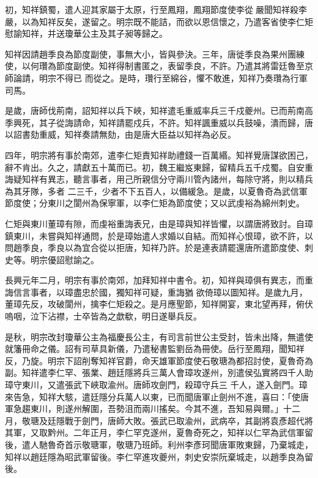 \begin{pinyinscope}
 初，知祥鎮蜀，遣人迎其家屬于太原，行至鳳翔，鳳翔節度使李從嚴聞知祥殺李嚴，以為知祥反矣，遂留之。明宗既不能詰，而欲以恩信懷之，乃遣客省使李仁矩慰諭知祥，并送瓊華公主及其子昶等歸之。



 知祥因請趙季良為節度副使，事無大小，皆與參決。三年，唐徙季良為果州團練使，以何瓚為節度副使。知祥得制書匿之，表留季良，不許。乃遣其將雷廷魯至京師論請，明宗不得已
 而從之。是時，瓚行至綿谷，懼不敢進，知祥乃奏瓚為行軍司馬。



 是歲，唐師伐荊南，詔知祥以兵下峽，知祥遣毛重威率兵三千戍夔州。已而荊南高季興死，其子從誨請命，知祥請罷戍兵，不許。知祥諷重威以兵鼓噪，潰而歸，唐以詔書劾重威，知祥奏請無劾，由是唐大臣益以知祥為必反。



 四年，明宗將有事於南郊，遣李仁矩責知祥助禮錢一百萬緡。知祥覺唐謀欲困己，辭不肯出。久之，請獻五十萬而已。初，魏王繼岌東歸，留精兵五千戍蜀。自安重誨疑知祥有異志，聽言事者，用己所親信分守兩川管內諸州，每除守將，則以精兵為其牙隊，多者
 二三千，少者不下五百人，以備緩急。是歲，以夏魯奇為武信軍節度使；分東川之閬州為保寧軍，以李仁矩為節度使；又以武虔裕為綿州刺史。



 仁矩與東川董璋有隙，而虔裕重誨表兄，由是璋與知祥皆懼，以謂唐將致討。自璋鎮東川，未嘗與知祥通問，於是璋始遣人求婚以自結。而知祥心恨璋，欲不許，以問趙季良，季良以為宜合從以拒唐，知祥乃許。於是連表請罷還唐所遣節度使、刺史等。明宗優詔慰諭之。



 長興元年二月，明宗有事於南郊，加拜知祥中書令。初，知祥與璋俱有異志，而重誨信言事者，以璋盡忠於國，獨知祥可疑，重誨猶
 欲倚璋以圖知祥。是歲九月，董璋先反，攻破閬州，擒李仁矩殺之。是月應聖節，知祥開宴，東北望再拜，俯伏嗚咽，泣下沾襟，士卒皆為之歔欷，明日遂舉兵反。



 是秋，明宗改封瓊華公主為福慶長公主，有司言前世公主受封，皆未出降，無遣使就籓冊命之儀。詔有司草具新儀，乃遣秘書監劉岳為冊使。岳行至鳳翔，聞知祥反，乃旋。明宗下詔削奪知祥官爵，命天雄軍節度使石敬瑭為都招討使，夏魯奇為副。知祥遣李仁罕、張業、趙廷隱將兵三萬人會璋攻遂州，別遣侯弘實將四千人助璋守東川，又遣張武下峽取渝州。唐師攻劍門，殺璋守兵三
 千人，遂入劍門。璋來告急，知祥大駭，遣廷隱分兵萬人以東，已而聞唐軍止劍州不進，喜曰：「使唐軍急趨東川，則遂州解圍，吾勢沮而兩川搖矣。今其不進，吾知易與爾。」十二月，敬瑭及廷隱戰于劍門，唐師大敗。張武已取渝州，武病卒，其副將袁彥超代將其軍，又取黔州。二年正月，李仁罕克遂州，夏魯奇死之，知祥以仁罕為武信軍留後，遣人馳魯奇首示敬瑭軍，敬瑭乃班師。利州李彥珂聞唐軍敗東歸，乃棄城走，知祥以趙廷隱為昭武軍留後。李仁罕進攻夔州，刺史安崇阮棄城走，以趙季良為留後。




\end{pinyinscope}
